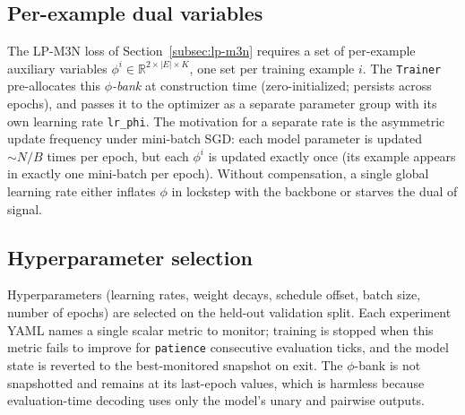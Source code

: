 \subsection{Per-example dual variables}
\label{subsec:method-training-phi}

The LP-M3N loss of Section~\ref{subsec:lp-m3n} requires a set
of per-example auxiliary variables
$\phi^{i} \in \mathbb{R}^{2 \times |E| \times K}$, one set per
training example $i$. The \texttt{Trainer} pre-allocates this
\emph{$\phi$-bank} at construction time (zero-initialized;
persists across epochs), and passes it to the optimizer as a
separate parameter group with its own learning rate
\texttt{lr\_phi}. The motivation for a separate rate is the
asymmetric update frequency under mini-batch SGD: each model
parameter is updated $\sim N / B$ times per epoch, but each
$\phi^{i}$ is updated exactly once (its example appears in
exactly one mini-batch per epoch). Without compensation, a
single global learning rate either inflates $\phi$ in lockstep
with the backbone or starves the dual of signal.

\subsection{Hyperparameter selection}
\label{subsec:method-training-hyperparams}

Hyperparameters (learning rates, weight decays, schedule
offset, batch size, number of epochs) are selected on the
held-out validation split. Each experiment YAML names a single
scalar metric to monitor; training is stopped when this metric
fails to improve for \texttt{patience} consecutive evaluation
ticks, and the model state is reverted to the best-monitored
snapshot on exit. The $\phi$-bank is not snapshotted and
remains at its last-epoch values, which is harmless because
evaluation-time decoding uses only the model's unary and
pairwise outputs.